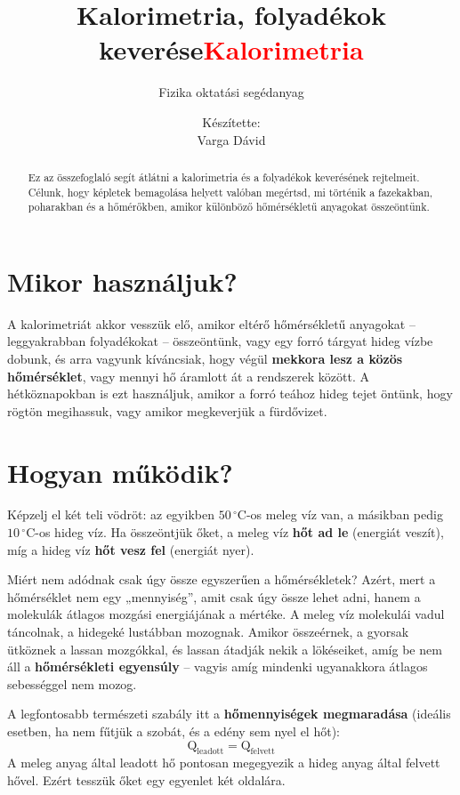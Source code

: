 \documentclass[11pt,a4paper]{article}
\title{Kalorimetria, folyadékok keverése}
\author{Fizika oktatási segédanyag}
\date{}
\providecommand{\textbfr}[1]{\textbf{\textcolor{red}{#1}}}
\begin{document}
\title{\textbfr{Kalorimetria}}
\author{Készítette:\\Varga Dávid}
\date{}
\maketitle

\begin{abstract}
Ez az összefoglaló segít átlátni a kalorimetria és a folyadékok keverésének rejtelmeit. Célunk, hogy képletek bemagolása helyett valóban megértsd, mi történik a fazekakban, poharakban és a hőmérőkben, amikor különböző hőmérsékletű anyagokat összeöntünk.
\end{abstract}

\section{Mikor használjuk?}
A kalorimetriát akkor vesszük elő, amikor eltérő hőmérsékletű anyagokat – leggyakrabban folyadékokat – összeöntünk, vagy egy forró tárgyat hideg vízbe dobunk, és arra vagyunk kíváncsiak, hogy végül \textbf{mekkora lesz a közös hőmérséklet}, vagy mennyi hő áramlott át a rendszerek között. A hétköznapokban is ezt használjuk, amikor a forró teához hideg tejet öntünk, hogy rögtön megihassuk, vagy amikor megkeverjük a fürdővizet.

\section{Hogyan működik?}
Képzelj el két teli vödröt: az egyikben $50\,^\circ\text{C}$-os meleg víz van, a másikban pedig $10\,^\circ\text{C}$-os hideg víz. Ha összeöntjük őket, a meleg víz \textbf{hőt ad le} (energiát veszít), míg a hideg víz \textbf{hőt vesz fel} (energiát nyer). 

Miért nem adódnak csak úgy össze egyszerűen a hőmérsékletek? Azért, mert a hőmérséklet nem egy „mennyiség”, amit csak úgy össze lehet adni, hanem a molekulák átlagos mozgási energiájának a mértéke. A meleg víz molekulái vadul táncolnak, a hidegeké lustábban mozognak. Amikor összeérnek, a gyorsak ütköznek a lassan mozgókkal, és lassan átadják nekik a lökéseiket, amíg be nem áll a \textbf{hőmérsékleti egyensúly} – vagyis amíg mindenki ugyanakkora átlagos sebességgel nem mozog.

A legfontosabb természeti szabály itt a \textbf{hőmennyiségek megmaradása} (ideális esetben, ha nem fűtjük a szobát, és a edény sem nyel el hőt):
$$\text{Q}_{\text{leadott}} = \text{Q}_{\text{felvett}}$$
A meleg anyag által leadott hő pontosan megegyezik a hideg anyag által felvett hővel. Ezért tesszük őket egy egyenlet két oldalára.
\end{document}
